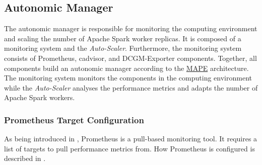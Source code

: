 \subsection{Autonomic Manager}
The autonomic manager is responsible for monitoring the computing environment and scaling the number of Apache Spark worker replicas.
It is composed of a monitoring system and the \textit{Auto-Scaler}.
Furthermore, the monitoring system consists of Prometheus, cadvisor, and DCGM-Exporter components.
Together, all components build an autonomic manager according to the \hyperlink{abbr:mape}{MAPE} architecture.
The monitoring system monitors the components in the computing environment while the \textit{Auto-Scaler} analyses the performance metrics and adapts the number of Apache Spark workers.


\subsubsection{Prometheus Target Configuration}




As being introduced in , Prometheus is a pull-based monitoring tool.
It requires a list of targets to pull performance metrics from. How Prometheus is configured is described in .


